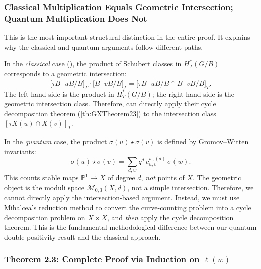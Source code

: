 \bigskip

\subsubsection[Classical multiplication = intersection; Quantum multiplication $\neq$ intersection]{Classical Multiplication Equals Geometric Intersection; Quantum Multiplication Does Not}
\label{sec:ClassicalVsQuantumKey}

This is the most important structural distinction in the entire proof. It explains why the classical and quantum arguments follow different paths.

\begin{Remark}\label{rmk:ClassicalVsQuantum}
In the \emph{classical} case (\cite[Chapter 1]{GX2025}), the product of Schubert classes in $H_T^*(G/B)$ corresponds to a geometric intersection:
$$\bigl[\tau\overline{B^-uB/B}\bigr]_T \cdot \bigl[\overline{B^-vB/B}\bigr]_T = \bigl[\tau\overline{B^-uB/B} \cap \overline{B^-vB/B}\bigr]_T.$$
The left-hand side is the product in $H_T^*(G/B)$; the right-hand side is the geometric intersection class. Therefore, \cite{GX2025} can directly apply their cycle decomposition theorem (\cref{th:GXTheorem23}) to the intersection class $[\tau X(u) \cap X(v)]_T$.

In the \emph{quantum} case, the product $\sigma(u) \star \sigma(v)$ is defined by Gromov--Witten invariants:
$$\sigma(u) \star \sigma(v) = \sum_{d,w} q^d\, c_{u,v}^{w,(d)}\,\sigma(w).$$
This counts stable maps $\mathbb{P}^1 \to X$ of degree $d$, \emph{not} points of $X$. The geometric object is the moduli space $\overline{\mathcal{M}}_{0,3}(X,d)$, not a simple intersection. Therefore, we cannot directly apply the intersection-based argument. Instead, we must use Mihalcea's reduction method to convert the curve-counting problem into a cycle decomposition problem on $X \times X$, and \emph{then} apply the cycle decomposition theorem. This is the fundamental methodological difference between our quantum double positivity result and the classical \cite{GX2025} approach.
\end{Remark}

\bigskip

\subsubsection{\cite{GX2025} Theorem 2.3: Complete Proof via Induction on $\ell(w)$}
\label{sec:GXTheorem23CompleteProof}

